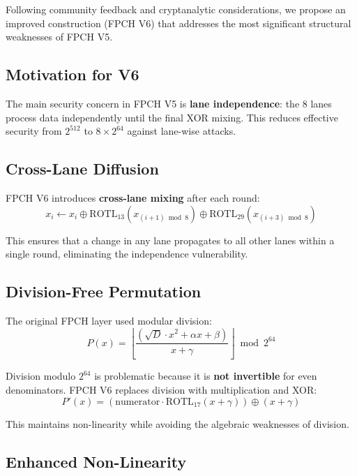 \documentclass[11pt,a4paper]{article}
\theoremstyle{plain}
\theoremstyle{definition}
\theoremstyle{remark}
\begin{document}
Following community feedback and cryptanalytic considerations, we propose an improved construction (FPCH V6) that addresses the most significant structural weaknesses of FPCH V5.

\subsection{Motivation for V6}

The main security concern in FPCH V5 is \textbf{lane independence}: the 8 lanes process data independently until the final XOR mixing. This reduces effective security from $2^{512}$ to $8 \times 2^{64}$ against lane-wise attacks.

\subsection{Cross-Lane Diffusion}

FPCH V6 introduces \textbf{cross-lane mixing} after each round:
\begin{equation}
x_i \leftarrow x_i \oplus \text{ROTL}_{13}(x_{(i+1) \bmod 8}) \oplus \text{ROTL}_{29}(x_{(i+3) \bmod 8})
\end{equation}

This ensures that a change in any lane propagates to all other lanes within a single round, eliminating the independence vulnerability.

\subsection{Division-Free Permutation}

The original FPCH layer used modular division:
\begin{equation}
P(x) = \left\lfloor \frac{(\sqrt{D} \cdot x^2 + \alpha x + \beta)}{x + \gamma} \right\rfloor \bmod 2^{64}
\end{equation}

Division modulo $2^{64}$ is problematic because it is \textbf{not invertible} for even denominators. FPCH V6 replaces division with multiplication and XOR:
\begin{equation}
P'(x) = \left(\text{numerator} \cdot \text{ROTL}_{17}(x + \gamma) \right) \oplus (x + \gamma)
\end{equation}

This maintains non-linearity while avoiding the algebraic weaknesses of division.

\subsection{Enhanced Non-Linearity}
\end{document}
